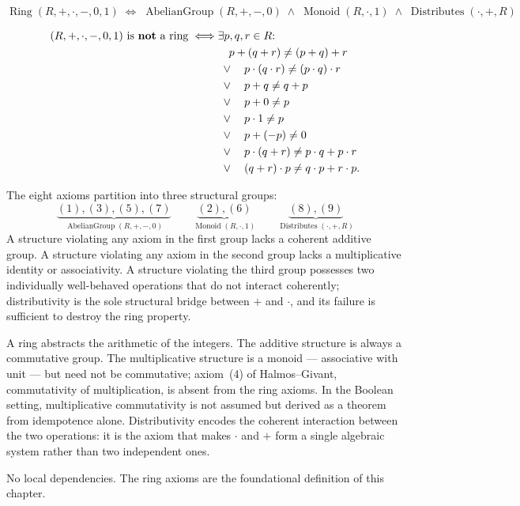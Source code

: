 \begin{remark*}
\[
\operatorname{Ring}(R,+,\cdot,-,0,1)
\;\Longleftrightarrow\;
\operatorname{AbelianGroup}(R,+,-,0)
\;\land\;
\operatorname{Monoid}(R,\cdot,1)
\;\land\;
\operatorname{Distributes}(\cdot,+,R)
\]
\end{remark*}

\begin{remark*}
\[
\begin{aligned}
(R,+,\cdot,-,0,1)\ \text{is \textbf{not} a ring}
\;\Longleftrightarrow\;
  &\exists p,q,r \in R{:} \\
  &\quad p + (q + r) \neq (p + q) + r \\
  &\;\lor\quad p \cdot (q \cdot r) \neq (p \cdot q) \cdot r \\
  &\;\lor\quad p + q \neq q + p \\
  &\;\lor\quad p + 0 \neq p \\
  &\;\lor\quad p \cdot 1 \neq p \\
  &\;\lor\quad p + (-p) \neq 0 \\
  &\;\lor\quad p \cdot (q + r) \neq p \cdot q + p \cdot r \\
  &\;\lor\quad (q + r) \cdot p \neq q \cdot p + r \cdot p.
\end{aligned}
\]
\end{remark*}

\begin{remark*}
The eight axioms partition into three structural groups:
\[
\underbrace{(1),(3),(5),(7)}_{\displaystyle\operatorname{AbelianGroup}(R,+,-,0)}
\qquad
\underbrace{(2),(6)}_{\displaystyle\operatorname{Monoid}(R,\cdot,1)}
\qquad
\underbrace{(8),(9)}_{\displaystyle\operatorname{Distributes}(\cdot,+,R)}
\]
A structure violating any axiom in the first group lacks a coherent
additive group.
A structure violating any axiom in the second group lacks a
multiplicative identity or associativity.
A structure violating the third group possesses two individually
well-behaved operations that do not interact coherently;
distributivity is the sole structural bridge between $+$ and
$\cdot$, and its failure is sufficient to destroy the ring property.
\end{remark*}

\begin{remark*}[Interpretation]
A ring abstracts the arithmetic of the integers.
The additive structure is always a commutative group.
The multiplicative structure is a monoid --- associative with
unit --- but need not be commutative; axiom~(4) of
Halmos--Givant, commutativity of multiplication, is absent from
the ring axioms.
In the Boolean setting, multiplicative commutativity is not
assumed but derived as a theorem from idempotence alone.
Distributivity encodes the coherent interaction between the
two operations: it is the axiom that makes $\cdot$ and $+$
form a single algebraic system rather than two independent ones.
\end{remark*}

\begin{remark*}[Dependencies]
No local dependencies. The ring axioms are the foundational
definition of this chapter.
\end{remark*}
